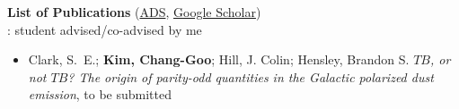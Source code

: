 \documentclass[12pt,preprint,letter]{aastex63}
\begin{document}
\begin{itemize}
\clearpage

\begin{center}
{\bf List of Publications} (\href{https://ui.adsabs.harvard.edu/search/q=\%3Dauthor\%3A\%22kim\%2Cchang-goo\%22}{ADS}, 
\href{https://scholar.google.com/citations?user=jBOsJgoAAAAJ&hl=en}{Google Scholar})\\
{: student advised/co-advised by me}\\
    
\end{center}

\begin{itemize}[itemsep=1pt]

\end{itemize}

\begin{itemize}[itemsep=1pt]

\end{itemize}

\begin{itemize}[itemsep=1pt]

\end{itemize}

\begin{itemize}[itemsep=1pt]

\item Clark, S.~E.; \textbf{Kim, Chang-Goo}; Hill, J. Colin; Hensley, Brandon S. \textit{$TB$, or not $TB$? The origin of parity-odd quantities in the Galactic polarized dust emission}, to be submitted



\end{itemize}
\end{itemize}
\end{document}
